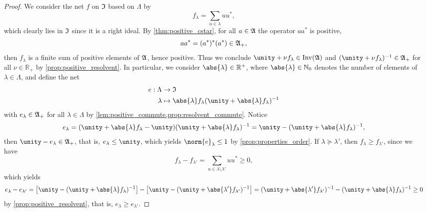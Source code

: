 \begin{proof}
    We consider the net \(f\) on \(\mathfrak{I}\) based on \(\Lambda\) by
    \begin{equation*}
        f_{\lambda} = \sum_{u \in \lambda} uu^*,
    \end{equation*}
    which clearly lies in \(\mathfrak{I}\) since it is a right ideal. By \cref{thm:positive_cstar}, for all \(a \in \mathfrak{A}\) the operator \(aa^*\) is positive,
    \begin{equation*}
        aa^* = (a^*)^*(a^*) \in \mathfrak{A}_+,
    \end{equation*}
    then \(f_{\lambda}\) is a finite sum of positive elements of \(\mathfrak{A}\), hence positive. Thus we conclude \(\unity + \nu f_{\lambda} \in \invertible{\algebra{A}}\) and \((\unity + \nu f_{\lambda})^{-1} \in \algebra{A}_+\) for all \(\nu \in \mathbb{R}_+\) by \cref{prop:positive_resolvent}. In particular, we consider \(\abs{\lambda} \in \mathbb{R}^+\), where \(\abs{\lambda} \in \mathbb{N}_0\) denotes the number of elements of \(\lambda \in \Lambda\), and define the net
    \begin{align*}
        e : \Lambda &\to \algebra{I}\\
            \lambda &\mapsto \abs{\lambda} f_{\lambda} (\unity + \abs{\lambda} f_{\lambda})^{-1}
    \end{align*}
    with \(e_{\lambda} \in \mathfrak{A}_+\) for all \(\lambda \in \Lambda\) by \cref{lem:positive_commute,prop:resolvent_commute}. Notice
    \begin{equation*}
        e_{\lambda} = (\unity + \abs{\lambda} f_{\lambda} - \unity)(\unity + \abs{\lambda}f_{\lambda})^{-1} = \unity - (\unity + \abs{\lambda} f_{\lambda})^{-1},
    \end{equation*}
    then \(\unity - e_{\lambda} \in \algebra{A}_+\), that is, \(e_{\lambda} \leq \unity\), which yields \(\norm{e}_{\lambda} \leq 1\) by \cref{prop:properties_order}. If \(\lambda \succeq \lambda'\), then \(f_{\lambda} \geq f_{\lambda'}\),  since we have
    \begin{equation*}
        f_{\lambda} - f_{\lambda'} = \sum_{u \in \lambda \setminus \lambda'} uu^* \geq 0,
    \end{equation*}
    which yields
    \begin{equation*}
        e_{\lambda} - e_{\lambda'} = \left[\unity - (\unity + \abs{\lambda} f_{\lambda})^{-1}\right] - \left[\unity - (\unity + \abs{\lambda'} f_{\lambda'})^{-1}\right] = (\unity + \abs{\lambda'}f_{\lambda'})^{-1} - (\unity + \abs{\lambda}f_{\lambda})^{-1} \geq 0
    \end{equation*}
    by \cref{prop:positive_resolvent}, that is, \(e_{\lambda} \geq e_{\lambda'}\).


\end{proof}
